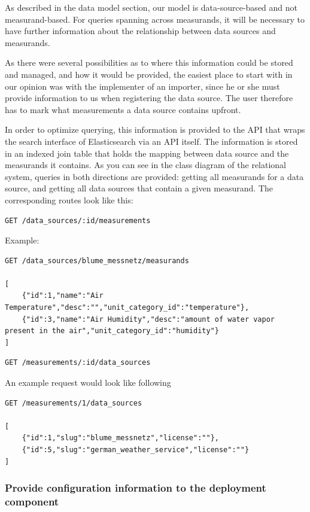 As described in the data model section, our model is data-source-based
and not measurand-based. For queries spanning across measurands, it will
be necessary to have further information about the relationship between
data sources and measurands.

As there were several possibilities as to where this information could
be stored and managed, and how it would be provided, the easiest place
to start with in our opinion was with the implementer of an importer,
since he or she must provide information to us when registering the data
source. The user therefore has to mark what measurements a data source
contains upfront.

In order to optimize querying, this information is provided to the API
that wraps the search interface of Elasticsearch via an API itself. The
information is stored in an indexed join table that holds the mapping
between data source and the measurands it contains. As you can see in
the class diagram of the relational system, queries
in both directions are provided: getting all measurands for a data
source, and getting all data sources that contain a given measurand. The
corresponding routes look like this:

\begin{verbatim}
GET /data_sources/:id/measurements
\end{verbatim}

Example:

\begin{verbatim}
GET /data_sources/blume_messnetz/measurands

[
    {"id":1,"name":"Air Temperature","desc":"","unit_category_id":"temperature"},
    {"id":3,"name":"Air Humidity","desc":"amount of water vapor present in the air","unit_category_id":"humidity"}
]
\end{verbatim}

\begin{verbatim}
GET /measurements/:id/data_sources
\end{verbatim}

An example request would look like following

\begin{verbatim}
GET /measurements/1/data_sources

[
    {"id":1,"slug":"blume_messnetz","license":""},
    {"id":5,"slug":"german_weather_service","license":""}
]
\end{verbatim}

\subsubsection{Provide configuration information to the deployment
component}\label{provide-configuration-information-to-the-deployment-component}

